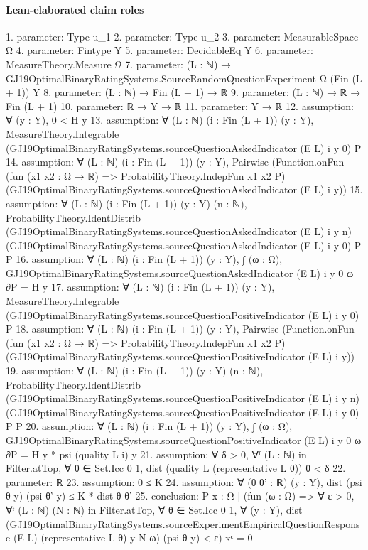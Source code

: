 \documentclass[10pt]{article}
\begin{document}
\paragraph{Lean-elaborated claim roles}\begin{ReviewVerbatim}
1. parameter: Type u_1
2. parameter: Type u_2
3. parameter: MeasurableSpace Ω
4. parameter: Fintype Y
5. parameter: DecidableEq Y
6. parameter: MeasureTheory.Measure Ω
7. parameter: (L : ℕ) → GJ19OptimalBinaryRatingSystems.SourceRandomQuestionExperiment Ω (Fin (L + 1)) Y
8. parameter: (L : ℕ) → Fin (L + 1) → ℝ
9. parameter: (L : ℕ) → ℝ → Fin (L + 1)
10. parameter: ℝ → Y → ℝ
11. parameter: Y → ℝ
12. assumption: ∀ (y : Y), 0 < H y
13. assumption: ∀ (L : ℕ) (i : Fin (L + 1)) (y : Y),
  MeasureTheory.Integrable (GJ19OptimalBinaryRatingSystems.sourceQuestionAskedIndicator (E L) i y 0) P
14. assumption: ∀ (L : ℕ) (i : Fin (L + 1)) (y : Y),
  Pairwise
    (Function.onFun (fun (x1 x2 : Ω → ℝ) => ProbabilityTheory.IndepFun x1 x2 P)
      (GJ19OptimalBinaryRatingSystems.sourceQuestionAskedIndicator (E L) i y))
15. assumption: ∀ (L : ℕ) (i : Fin (L + 1)) (y : Y) (n : ℕ),
  ProbabilityTheory.IdentDistrib (GJ19OptimalBinaryRatingSystems.sourceQuestionAskedIndicator (E L) i y n)
    (GJ19OptimalBinaryRatingSystems.sourceQuestionAskedIndicator (E L) i y 0) P P
16. assumption: ∀ (L : ℕ) (i : Fin (L + 1)) (y : Y),
  ∫ (ω : Ω), GJ19OptimalBinaryRatingSystems.sourceQuestionAskedIndicator (E L) i y 0 ω ∂P = H y
17. assumption: ∀ (L : ℕ) (i : Fin (L + 1)) (y : Y),
  MeasureTheory.Integrable (GJ19OptimalBinaryRatingSystems.sourceQuestionPositiveIndicator (E L) i y 0) P
18. assumption: ∀ (L : ℕ) (i : Fin (L + 1)) (y : Y),
  Pairwise
    (Function.onFun (fun (x1 x2 : Ω → ℝ) => ProbabilityTheory.IndepFun x1 x2 P)
      (GJ19OptimalBinaryRatingSystems.sourceQuestionPositiveIndicator (E L) i y))
19. assumption: ∀ (L : ℕ) (i : Fin (L + 1)) (y : Y) (n : ℕ),
  ProbabilityTheory.IdentDistrib (GJ19OptimalBinaryRatingSystems.sourceQuestionPositiveIndicator (E L) i y n)
    (GJ19OptimalBinaryRatingSystems.sourceQuestionPositiveIndicator (E L) i y 0) P P
20. assumption: ∀ (L : ℕ) (i : Fin (L + 1)) (y : Y),
  ∫ (ω : Ω), GJ19OptimalBinaryRatingSystems.sourceQuestionPositiveIndicator (E L) i y 0 ω ∂P = H y * psi (quality L i) y
21. assumption: ∀ δ > 0, ∀ᶠ (L : ℕ) in Filter.atTop, ∀ θ ∈ Set.Icc 0 1, dist (quality L (representative L θ)) θ < δ
22. parameter: ℝ
23. assumption: 0 ≤ K
24. assumption: ∀ (θ θ' : ℝ) (y : Y), dist (psi θ y) (psi θ' y) ≤ K * dist θ θ'
25. conclusion: P
    {x : Ω |
        (fun (ω : Ω) =>
            ∀ ε > 0,
              ∀ᶠ (L : ℕ) (N : ℕ) in Filter.atTop,
                ∀ θ ∈ Set.Icc 0 1,
                  ∀ (y : Y),
                    dist
                        (GJ19OptimalBinaryRatingSystems.sourceExperimentEmpiricalQuestionResponse (E L)
                          (representative L θ) y N ω)
                        (psi θ y) <
                      ε)
          x}ᶜ =
  0
\end{ReviewVerbatim}
\end{document}
